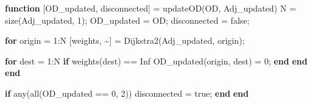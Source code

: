 \documentclass[
  letterpaper,
  DIV=11,
  numbers=noendperiod]{scrartcl}
\newenvironment{Shaded}{\begin{snugshade}}{\end{snugshade}}
\newcommand{\FloatTok}[1]{\textcolor[rgb]{0.68,0.00,0.00}{#1}}
\newcommand{\KeywordTok}[1]{\textcolor[rgb]{0.00,0.23,0.31}{\textbf{#1}}}
\newcommand{\NormalTok}[1]{\textcolor[rgb]{0.00,0.23,0.31}{#1}}
\newcommand{\OperatorTok}[1]{\textcolor[rgb]{0.37,0.37,0.37}{#1}}
\newcommand{\VariableTok}[1]{\textcolor[rgb]{0.07,0.07,0.07}{#1}}
\begin{document}
\begin{Shaded}
\begin{Highlighting}[]
\KeywordTok{function}\NormalTok{ [}\VariableTok{OD\_updated}\OperatorTok{,} \VariableTok{disconnected}\NormalTok{] }\OperatorTok{=} \VariableTok{updateOD}\NormalTok{(}\VariableTok{OD}\OperatorTok{,} \VariableTok{Adj\_updated}\NormalTok{)}
    \VariableTok{N} \OperatorTok{=} \VariableTok{size}\NormalTok{(}\VariableTok{Adj\_updated}\OperatorTok{,} \FloatTok{1}\NormalTok{)}\OperatorTok{;}
    \VariableTok{OD\_updated} \OperatorTok{=} \VariableTok{OD}\OperatorTok{;}
    \VariableTok{disconnected} \OperatorTok{=} \VariableTok{false}\OperatorTok{;}

    \KeywordTok{for} \VariableTok{origin} \OperatorTok{=} \FloatTok{1}\OperatorTok{:}\VariableTok{N}
\NormalTok{        [}\VariableTok{weights}\OperatorTok{,} \OperatorTok{\textasciitilde{}}\NormalTok{] }\OperatorTok{=} \VariableTok{Dijkstra2}\NormalTok{(}\VariableTok{Adj\_updated}\OperatorTok{,} \VariableTok{origin}\NormalTok{)}\OperatorTok{;}

        \KeywordTok{for} \VariableTok{dest} \OperatorTok{=} \FloatTok{1}\OperatorTok{:}\VariableTok{N}
            \KeywordTok{if} \VariableTok{weights}\NormalTok{(}\VariableTok{dest}\NormalTok{) }\OperatorTok{==} \VariableTok{Inf}
                \VariableTok{OD\_updated}\NormalTok{(}\VariableTok{origin}\OperatorTok{,} \VariableTok{dest}\NormalTok{) }\OperatorTok{=} \FloatTok{0}\OperatorTok{;}
            \KeywordTok{end}
        \KeywordTok{end}
    \KeywordTok{end}

    \KeywordTok{if} \VariableTok{any}\NormalTok{(}\VariableTok{all}\NormalTok{(}\VariableTok{OD\_updated} \OperatorTok{==} \FloatTok{0}\OperatorTok{,} \FloatTok{2}\NormalTok{))}
        \VariableTok{disconnected} \OperatorTok{=} \VariableTok{true}\OperatorTok{;}
    \KeywordTok{end}
\KeywordTok{end}
\end{Highlighting}
\end{Shaded}
\end{document}

